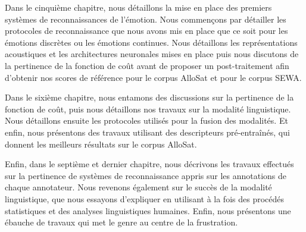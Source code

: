 Dans le cinquième chapitre, nous détaillons la mise en place des premiers systèmes de reconnaissances de l'émotion. Nous commençons par détailler les protocoles de reconnaissance que nous avons mis en place que ce soit pour les émotions discrètes ou les émotions continues. Nous détaillons les représentations acoustiques et les architectures neuronales mises en place puis nous discutons de la pertinence de la fonction de coût avant de proposer un post-traitement afin d'obtenir nos scores de référence pour le corpus AlloSat et pour le corpus SEWA.

Dans le sixième chapitre, nous entamons des discussions sur la pertinence de la fonction de coût, puis nous détaillons nos travaux sur la modalité linguistique. Nous détaillons ensuite les protocoles utilisés pour la fusion des modalités. Et enfin, nous présentons des travaux utilisant des descripteurs pré-entraînés, qui donnent les meilleurs résultats sur le corpus AlloSat.

Enfin, dans le septième et dernier chapitre, nous décrivons les travaux effectués sur la pertinence de systèmes de reconnaissance appris sur les annotations de chaque annotateur. Nous revenons également sur le succès de la modalité linguistique, que nous essayons d'expliquer en utilisant à la fois des procédés statistiques et des analyses linguistiques humaines. Enfin, nous présentons une ébauche de travaux qui met le genre au centre de la frustration.
